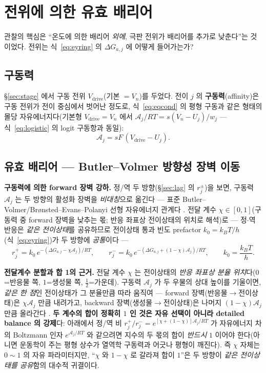 \documentclass[11pt,a4paper]{article}
\newcommand{\drive}{\mathrm{drive}}
\begin{document}
\section{전위에 의한 유효 배리어}\label{sec:barrier}
관찰의 핵심은 ``온도에 의한 배리어 \emph{외에}, 극판 전위가 배리어를 추가로 낮춘다''는 것이었다.
전위는 식~\eqref{eq:eyring} 의 $\Delta G_{a,j}$ 에 어떻게 들어가는가?

\subsection{구동력}
\S\ref{sec:stage} 에서 구동 전위 $V_\drive$(기본 $=V_n$)를 두었다. 전이 $j$ 의 \textbf{구동력}(affinity)은
구동 전위가 전이 중심에서 벗어난 정도로, 식~\eqref{eq:eqcond} 의 평형 구동과 같은 형태의 몰당 자유에너지다(기본형
$V_\drive=V_n$ 에서 $\mathcal A_j/RT=s(V_n-U_j)/w_j$ — 식~\eqref{eq:logistic} 의 logit 구동항과 동일):
\begin{equation}
\mathcal A_j=sF\,(V_\drive-U_j).
\label{eq:affinity}
\end{equation}

\subsection{유효 배리어 — Butler--Volmer 방향성 장벽 이동}
\textbf{구동력에 의한 forward 장벽 강하.} 정/역 두 방향(\S\ref{sec:lag} 의 $r_j^\pm$)을 보면, 구동력 $\mathcal A_j$ 는
두 방향의 활성화 장벽을 \emph{비대칭}으로 옮긴다 — 표준 Butler--Volmer/Brønsted--Evans--Polanyi 선형 자유에너지
관계다 \cite{bardfaulkner,evanspolanyi1938}. 전달 계수 $\chi\in[0,1]$(구동력 중 forward 장벽을 낮추는 몫; 반응
좌표상 전이상태의 위치로 해석)로 — 정$\cdot$역 반응은 \emph{같은 전이상태}를 공유하므로 전이상태 통과 빈도
prefactor $k_0=k_BT/h$(식~\eqref{eq:eyring})가 두 방향에 \emph{공통}이다 —
\begin{equation}
r_j^+=k_0\,e^{-(\Delta G_{a,j}-\chi\mathcal A_j)/RT},\qquad
r_j^-=k_0\,e^{-(\Delta G_{a,j}+(1-\chi)\mathcal A_j)/RT},\qquad k_0=\frac{k_BT}{h}.
\label{eq:bv}
\end{equation}

\textbf{전달계수 분할과 합 1의 근거.} 전달 계수 $\chi$ 는 전이상태의 \emph{반응 좌표상 분율
위치}다($0$=반응물 쪽, $1$=생성물 쪽, $\tfrac12$=가운데). 구동력 $\mathcal A_j$ 가 두 우물의 상대 높이를
기울이면, \emph{같은 한 점}인 전이상태가 그 분율만큼 따라 움직여 — forward 장벽(반응물$\to$전이상태)은
$\chi\mathcal A_j$ 만큼 내려가고, backward 장벽(생성물$\to$전이상태)은 나머지 $(1-\chi)\mathcal A_j$ 만큼 올라간다
\cite{evanspolanyi1938,bardfaulkner}. \textbf{두 계수의 합이 정확히 $1$ 인 것은 자유 선택이 아니라 detailed
balance 의 강제}다: 아래에서 정/역 비 $r_j^+/r_j^-=e^{[\chi+(1-\chi)]\mathcal A_j/RT}$ 가 자유에너지 차의
Boltzmann 인자 $e^{\mathcal A_j/RT}$ 와 같으려면 지수의 두 몫의 합이 \emph{반드시} $1$ 이어야 한다(아니면
운동학이 주는 평형 상수가 열역학 구동력과 어긋나 평형이 깨진다). 즉 $\chi$ 자체는 $0\!\sim\!1$ 의 자유
파라미터지만, ``$\chi$ 와 $1-\chi$ 로 갈라져 합이 $1$''은 두 방향이 \emph{같은 전이상태를 공유}함의 대수적
귀결이다.
\end{document}

